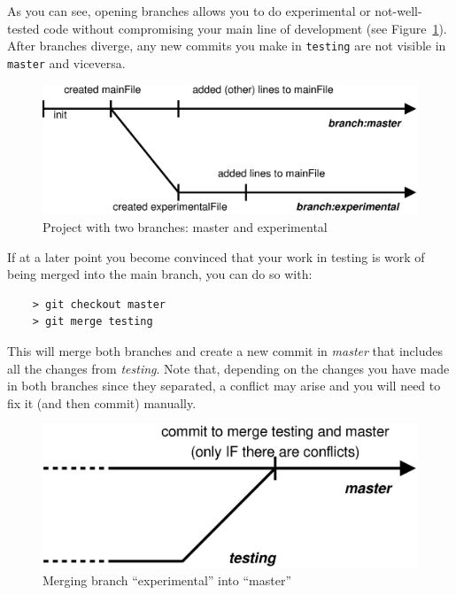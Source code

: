As you can see, opening branches allows you to do experimental or
not-well-tested code without compromising your main line of
development (see Figure~\ref{fig:git-example-3}). 
After branches diverge, any new commits you make in \verb+testing+ are not
visible in \verb+master+ and viceversa. 

\begin{figure}[htbp!]
  \centering
  \includegraphics[width=\textwidth]{gfx/commit_history_3.eps}
  \caption{Project with two branches: master and experimental}
  \label{fig:git-example-3}
\end{figure}

If at a later point you become convinced that your work
in testing is work of being merged into the main branch, you can do so
with:

\begin{verbatim}
    > git checkout master
    > git merge testing
\end{verbatim}

This will merge both branches and create a new commit in \emph{master}
that includes all the changes from \emph{testing}. Note that,
depending on the changes you have made in both branches since they
separated, a conflict may arise and you will need to 
fix it (and then commit) manually.

\begin{figure}[htbp!]
  \centering
  \includegraphics[width=\textwidth]{gfx/commit_history_4.eps}
  \caption{Merging branch ``experimental'' into ``master''}
  \label{fig:git-example-4}
\end{figure}

